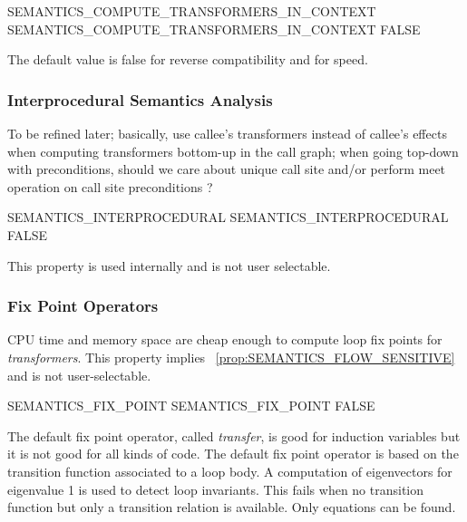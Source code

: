 \documentclass[a4paper]{report}
\newcommand{\PipsPropRef}[1]{\texttt{\detokenize{#1}}~\ref{prop:#1}}
\begin{document}
\begin{PipsProp}{SEMANTICS_COMPUTE_TRANSFORMERS_IN_CONTEXT}
SEMANTICS_COMPUTE_TRANSFORMERS_IN_CONTEXT FALSE
\end{PipsProp}

The default value is false for reverse compatibility and for speed.

\subsubsection{Interprocedural Semantics Analysis}

To be refined later; basically, use callee's transformers instead of
callee's effects when computing transformers bottom-up in the call graph;
when going top-down with preconditions, should we care about unique
call site and/or perform meet operation on call site preconditions ?

\begin{PipsProp}{SEMANTICS_INTERPROCEDURAL}
SEMANTICS_INTERPROCEDURAL FALSE
\end{PipsProp}

This property is used internally and is not user selectable.

\subsubsection{Fix Point Operators}

CPU time and memory space are cheap enough to compute loop fix points
for {\em transformers}. This property implies
\PipsPropRef{SEMANTICS_FLOW_SENSITIVE} and is not user-selectable.

\begin{PipsProp}{SEMANTICS_FIX_POINT}
SEMANTICS_FIX_POINT FALSE
\end{PipsProp}

The default fix point operator, called {\em transfer}, is good for
induction variables but it is not good for all kinds of code. The default
fix point operator is based on the transition function associated to a
loop body. A computation of eigenvectors for eigenvalue 1 is used to
detect loop invariants. This fails when no transition function but only a
transition relation is available. Only equations can be found.
\end{document}
